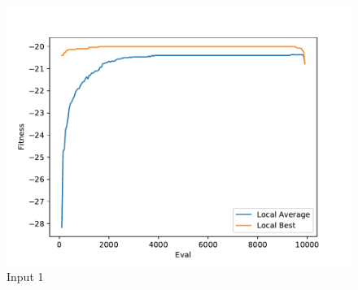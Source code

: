 \documentclass{standalone}
\begin{document}
\begin{figure}[!htb]
	\caption{Input 1}
	\label{fig:graph_1040}
	\includegraphics[width=\textwidth]{../graphs/graphs/1040.pdf}
\end{figure}
\end{document}
